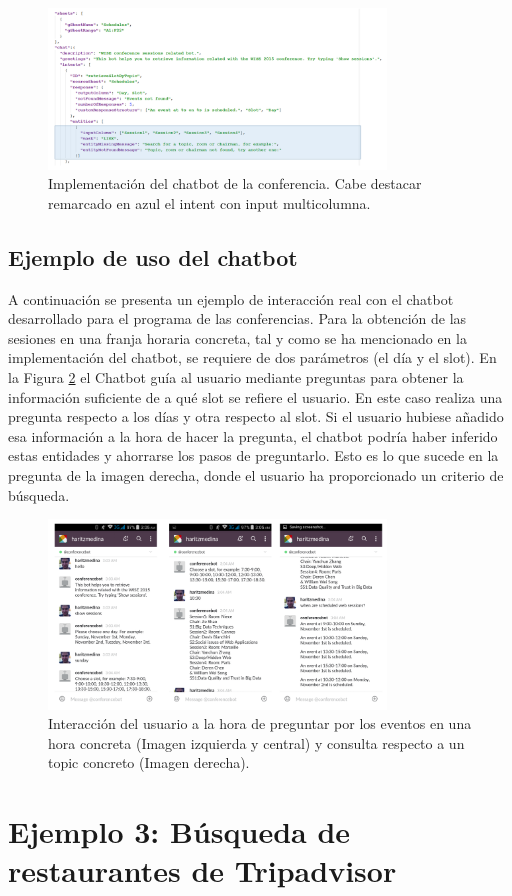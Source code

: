 \begin{figure}[htb]
	\centering
	\includegraphics[width=0.8\textwidth]{./figs/DSLConference.png}
	\caption{Implementación del chatbot de la conferencia. Cabe destacar remarcado en azul el intent con input multicolumna.}
	\label{fig:DSLConference}
\end{figure}

\subsection{Ejemplo de uso del chatbot}

A continuación se presenta un ejemplo de interacción real con el chatbot desarrollado para el programa de las conferencias. Para la obtención de las sesiones en una franja horaria concreta, tal y como se ha mencionado en la implementación del chatbot, se requiere de dos parámetros (el día y el slot). En la Figura \ref{fig:EjecucionConference} el Chatbot guía al usuario mediante preguntas para obtener la información suficiente de a qué slot se refiere el usuario. En este caso realiza una pregunta respecto a los días y otra respecto al slot. Si el usuario hubiese añadido esa información a la hora de hacer la pregunta, el chatbot podría haber inferido estas entidades y ahorrarse los pasos de preguntarlo. Esto es lo que sucede en la pregunta de la imagen derecha, donde el usuario ha proporcionado un criterio de búsqueda.

\begin{figure}[htb]
	\centering
	\includegraphics[width=0.8\textwidth]{./figs/EjecucionConferencia.png}
	\caption{Interacción del usuario a la hora de preguntar por los eventos en una hora concreta (Imagen izquierda y central) y consulta respecto a un topic concreto (Imagen derecha).}
	\label{fig:EjecucionConference}
\end{figure}


\section{Ejemplo 3: Búsqueda de restaurantes de Tripadvisor}

